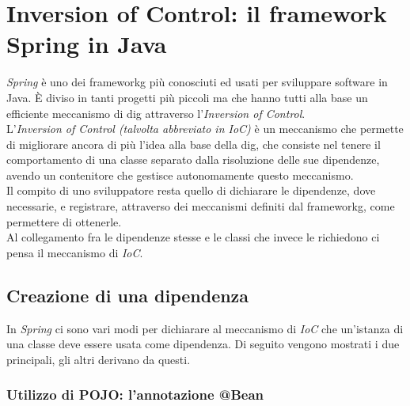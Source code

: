 \section{Inversion of Control: il framework Spring in Java}
\label{sec:ioc-spring-java}

\emph{Spring} è uno dei \gls{frameworkg} più conosciuti ed usati per sviluppare software in Java. È diviso in tanti progetti più piccoli ma che hanno tutti alla base un efficiente meccanismo di \gls{dig} attraverso l'\emph{Inversion of Control}.\\
L'\emph{Inversion of Control (talvolta abbreviato in IoC)} è un meccanismo che permette di migliorare ancora di più l'idea alla base della \gls{dig}, che consiste nel tenere il comportamento di una classe separato dalla risoluzione delle sue dipendenze, avendo un contenitore che gestisce autonomamente questo meccanismo.\\
Il compito di uno sviluppatore resta quello di dichiarare le dipendenze, dove necessarie, e registrare, attraverso dei meccanismi definiti dal \gls{frameworkg}, come permettere di ottenerle.\\
Al collegamento fra le dipendenze stesse e le classi che invece le richiedono ci pensa il meccanismo di \emph{IoC}.\\

\subsection{Creazione di una dipendenza}
\label{subsec:creazione-dipendenza-spring}

In \emph{Spring} ci sono vari modi per dichiarare al meccanismo di \emph{IoC} che un'istanza di una classe deve essere usata come dipendenza. Di seguito vengono mostrati i due principali, gli altri derivano da questi.

\subsubsection{Utilizzo di POJO: l'annotazione @Bean}
\label{subsubsec:utilizzo-pojo-annotazione-bean-spring}

